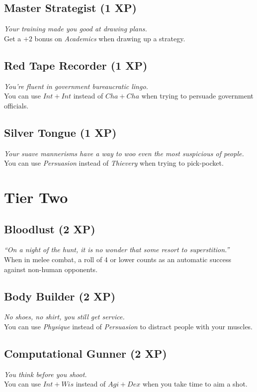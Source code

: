 \subsection{Master Strategist (1 XP)}
\textit{Your training made you good at drawing plans.}\\
Get a $+2$ bonus on \textit{Academics} when drawing up a strategy.

\subsection{Red Tape Recorder (1 XP)}
\textit{You're fluent in government bureaucratic lingo.}\\ 
You can use $Int + Int$ instead of $Cha + Cha$ when trying to persuade government officials.

\subsection{Silver Tongue (1 XP)}
\textit{Your suave mannerisms have a way to woo even the most suspicious of people.}\\
You can use \textit{Persuasion} instead of \textit{Thievery} when trying to pick-pocket.

\section{Tier Two}

\subsection{Bloodlust (2 XP)}
\textit{``On a night of the hunt, it is no wonder that some resort to superstition.''}\\
When in melee combat, a roll of 4 or lower counts as an automatic success against non-human opponents.

\subsection{Body Builder (2 XP)}
\textit{No shoes, no shirt, you still get service.}\\
You can use \textit{Physique} instead of \textit{Persuasion} to distract people with your muscles.

\subsection{Computational Gunner (2 XP)}
\textit{You think before you shoot.}\\
You can use $Int+Wis$ instead of $Agi+Dex$ when you take time to aim a shot.

